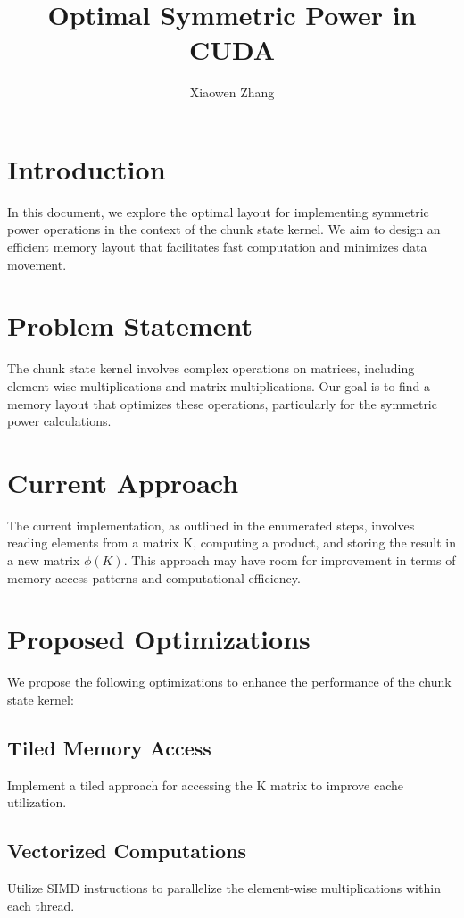 \documentclass{article}
\begin{document}
\title{Optimal Symmetric Power in CUDA}
\author{Xiaowen Zhang}
\date{}

\maketitle

\section{Introduction}
In this document, we explore the optimal layout for implementing symmetric power operations in the context of the chunk state kernel. We aim to design an efficient memory layout that facilitates fast computation and minimizes data movement.

\section{Problem Statement}
The chunk state kernel involves complex operations on matrices, including element-wise multiplications and matrix multiplications. Our goal is to find a memory layout that optimizes these operations, particularly for the symmetric power calculations.

\section{Current Approach}
The current implementation, as outlined in the enumerated steps, involves reading elements from a matrix K, computing a product, and storing the result in a new matrix $\phi(K)$. This approach may have room for improvement in terms of memory access patterns and computational efficiency.

\section{Proposed Optimizations}
We propose the following optimizations to enhance the performance of the chunk state kernel:

\subsection{Tiled Memory Access}
Implement a tiled approach for accessing the K matrix to improve cache utilization.

\subsection{Vectorized Computations}
Utilize SIMD instructions to parallelize the element-wise multiplications within each thread.
\end{document}
